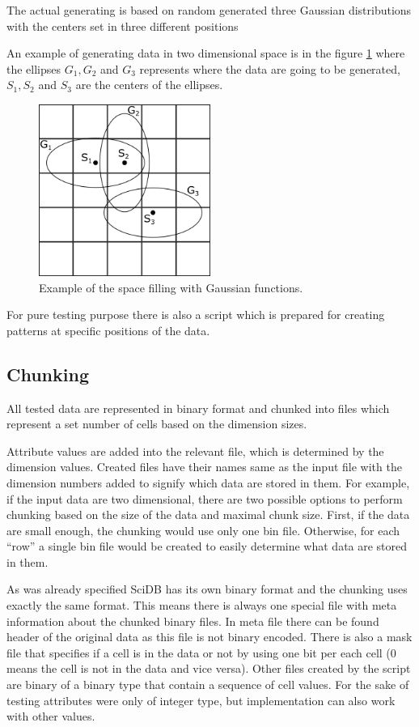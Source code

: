 The actual generating is based on random generated three Gaussian distributions with the centers set in three different positions

An example of generating data in two dimensional space is in the figure \ref{gauss} where the ellipses $G_1, G_2$ and $G_3$ represents where the data are going to be generated, $S_1, S_2$ and $S_3$ are the centers of the ellipses.


\begin{figure}
\centering
\includegraphics[width=0.5\textwidth]{gauss}
\caption{Example of the space filling with Gaussian functions. \cite{mdApproxPM}}
\label{gauss}
\end{figure}

For pure testing purpose there is also a script which is prepared for creating patterns at specific positions of the data.

\subsection{Chunking}\label{chunking}
All tested data are represented in binary format and chunked into files which represent a set number of cells based on the dimension sizes.

Attribute values are added into the relevant file, which is determined by the dimension values. Created files have their names same as the input file with the dimension numbers added to signify which data are stored in them. For example, if the input data are two dimensional, there are two possible options to perform chunking based on the size of the data and maximal chunk size. First, if the data are small enough, the chunking would use only one bin file. Otherwise, for each ``row'' a single bin file would be created to easily determine what data are stored in them.

As was already specified SciDB has its own binary format and the chunking uses exactly the same format. This means there is always one special file with meta information about the chunked binary files. In meta file there can be found header of the original data as this file is not binary encoded. There is also a mask file that specifies if a cell is in the data or not by using one bit per each cell (0 means the cell is not in the data and vice versa). Other files created by the script are binary of a binary type that contain a sequence of cell values. For the sake of testing attributes were only of integer type, but implementation can also work with other values.

